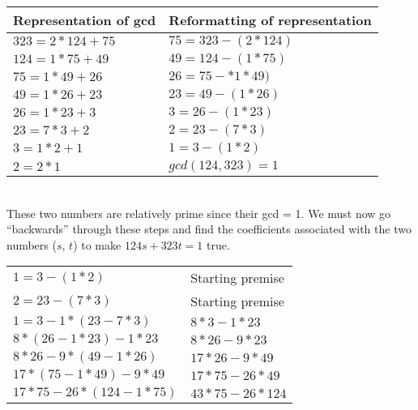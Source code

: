 \documentclass[11pt]{article}
\begin{document}
\begin{enumerate}
\begin{enumerate}[(a)]
\begin{tabular}{ll}
				Representation of gcd & Reformatting of representation \\

				\hline 

				$323 = 2 * 124 + 75$ & $75 = 323 - (2 * 124)$\\

				$124 = 1 * 75 +49$ & $49 = 124 - (1 * 75)$\\

				$75 = 1 * 49 + 26$ & $26 = 75 - *1*49)$\\

				$49 = 1 * 26 + 23$ & $23 = 49 - (1 * 26)$\\

				$26 = 1 * 23 + 3$ & $3 = 26 - (1 * 23)$\\

				$23 = 7 * 3 + 2$ & $2 = 23 - (7 * 3)$\\

				$3 = 1 * 2 + 1$ & $1 = 3 - (1 * 2)$\\

				$2 = 2 * 1$ & $gcd(124, 323) = 1$ \\

			\end{tabular} \\

			These two numbers are relatively prime since their gcd = 1. We must now go ``backwards''
			through these steps and find the coefficients associated with the two numbers ($s$, $t$)
			to make $124s + 323t = 1$ true.

			\begin{tabular}{ll}
				$1 = 3 - (1 * 2)$ & Starting premise\\

				$2 = 23 - (7 * 3)$ & Starting premise\\

				$1 = 3 - 1 * (23 - 7 * 3)$ & $8 * 3 - 1 * 23$ \\

				$8 * (26 - 1 * 23) - 1 * 23$ & $8 * 26 - 9 * 23$ \\

				$8 * 26 - 9 * (49 - 1 * 26)$ & $17 * 26 - 9 * 49$ \\

				$17 * (75 - 1 * 49) - 9 * 49$ & $17 * 75 - 26 * 49$ \\

				$17 * 75 - 26 * (124 - 1 * 75)$ & $43 * 75 - 26 * 124$ \\


\end{tabular}
\end{enumerate}
\end{enumerate}
\end{document}
